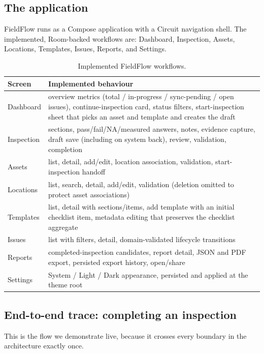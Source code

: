 \documentclass[11pt,a4paper]{article}
\begin{document}
\subsection{The application}

FieldFlow runs as a Compose application with a Circuit navigation shell. The
implemented, Room-backed workflows are: Dashboard, Inspection, Assets,
Locations, Templates, Issues, Reports, and Settings.

\begin{table}[H]
\centering
\small
\begin{tabularx}{\linewidth}{@{}l X@{}}
\toprule
\textbf{Screen} & \textbf{Implemented behaviour} \\
\midrule
Dashboard  & overview metrics (total / in-progress / sync-pending / open issues), continue-inspection card, status filters, start-inspection sheet that picks an asset and template and creates the draft \\
Inspection & sections, pass/fail/NA/measured answers, notes, evidence capture, draft save (including on system back), review, validation, completion \\
Assets     & list, detail, add/edit, location association, validation, start-inspection handoff \\
Locations  & list, search, detail, add/edit, validation (deletion omitted to protect asset associations) \\
Templates  & list, detail with sections/items, add template with an initial checklist item, metadata editing that preserves the checklist aggregate \\
Issues     & list with filters, detail, domain-validated lifecycle transitions \\
Reports    & completed-inspection candidates, report detail, JSON and PDF export, persisted export history, open/share \\
Settings   & System / Light / Dark appearance, persisted and applied at the theme root \\
\bottomrule
\end{tabularx}
\caption{Implemented FieldFlow workflows.}
\end{table}

\subsection{End-to-end trace: completing an inspection}

This is the flow we demonstrate live, because it crosses every boundary in the
architecture exactly once.
\end{document}
